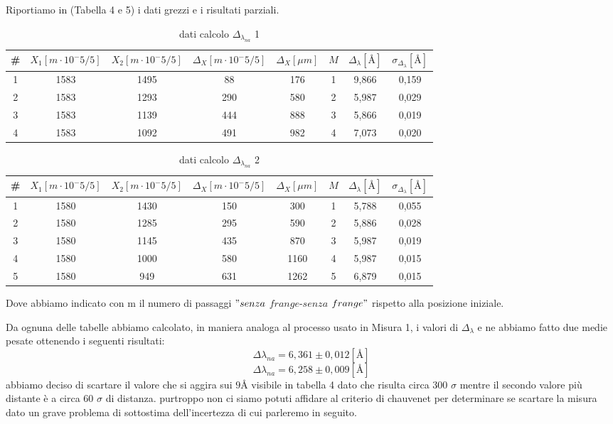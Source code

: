 \documentclass{article}
\begin{document}
Riportiamo in (Tabella 4 e 5) i dati grezzi e i risultati parziali.

\begin{table}[h!]
\centering
\begin{tabular}{ | c | c | c | c | c | c | c | c |}
\hline
 \# & $X_1 [m \cdot 10^-5/5]$ & $X_2 [m \cdot 10^-5/5]$ & $\Delta_X [m \cdot 10^-5/5]$ & $\Delta_X [\mu m]$ & $M$ & $\Delta_\lambda [\textrm{Å}]$ & $\sigma_{\Delta_\lambda} [\textrm{Å}]$\\
\hline
   1 & 1583 & 1495 & 88 & 176 & 1 & 9,866 & 0,159\\
   2 & 1583 & 1293 & 290 & 580 & 2 & 5,987 & 0,029\\
   3 & 1583 & 1139 & 444 & 888 & 3 & 5,866 & 0,019\\
   4 & 1583 & 1092 & 491 & 982 & 4 & 7,073 & 0,020\\
\hline
\end{tabular}
\caption{dati calcolo $\Delta_{\lambda_{na}}$ 1}
\label{table:4}
\end{table}


\begin{table}[h!]
\centering
\begin{tabular}{ | c | c | c | c | c | c | c | c |}
\hline
 \# & $X_1 [m \cdot 10^-5/5]$ & $X_2 [m \cdot 10^-5/5]$ & $\Delta_X [m \cdot 10^-5/5]$ & $\Delta_X [\mu m]$ & $M$ & $\Delta_\lambda [\textrm{Å}]$ & $\sigma_{\Delta_\lambda} [\textrm{Å}]$\\
\hline
   1 & 1580 & 1430 & 150 & 300 & 1 & 5,788 & 0,055\\
   2 & 1580 & 1285 & 295 & 590 & 2 & 5,886 & 0,028\\
   3 & 1580 & 1145 & 435 & 870 & 3 & 5,987 & 0,019\\
   4 & 1580 & 1000 & 580 & 1160 & 4 & 5,987 & 0,015\\
   5 & 1580 & 949 & 631 & 1262 & 5 & 6,879 & 0,015\\
\hline
\end{tabular}
\caption{dati calcolo $\Delta_{\lambda_{na}}$ 2}
\label{table:5}
\end{table}


\pagebreak
Dove abbiamo indicato con m il numero di passaggi $"senza$ $frange$-$senza$ $frange"$ rispetto alla posizione iniziale.

Da ognuna delle tabelle abbiamo calcolato, in maniera analoga al processo usato in Misura 1, i valori di $\Delta_\lambda$ e ne abbiamo fatto due medie pesate ottenendo i seguenti risultati:
\[ \Delta \lambda_{na} = 6,361 \pm 0,012 [\textrm{Å}] \]
\[ \Delta \lambda_{na} = 6,258 \pm 0,009 [\textrm{Å}] \]
abbiamo deciso di scartare il valore che si aggira sui $9 \textrm{Å}$ visibile in tabella 4 dato che risulta circa 300 $\sigma$ mentre il secondo valore più distante è a circa 60 $\sigma$ di distanza. purtroppo non ci siamo potuti affidare al criterio di chauvenet per determinare se scartare la misura dato un grave problema di sottostima dell'incertezza di cui parleremo in seguito.
\end{document}
